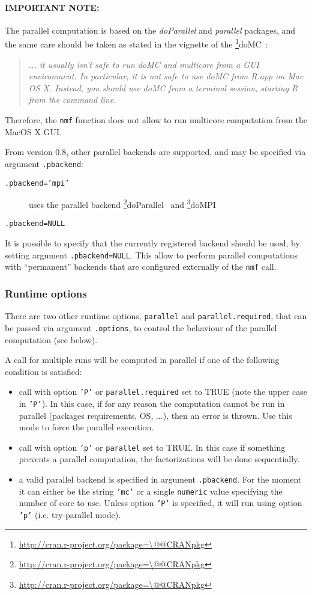 \documentclass[a4paper]{article}\usepackage{graphicx, color}
\makeatletter
\let\code=\texttt
\newcommand{\pkgname}[1]{\textit{#1}\xspace}
\newcommand{\CRANurl}[1]{\url{http://cran.r-project.org/package=#1}}
\def\CRANpkg{\@ifstar\@CRANpkg\@@CRANpkg}
\def\@CRANpkg#1{\href{http://cran.r-project.org/package=#1}{\pkgname{#1}}\footnote{\CRANurl{#1}}}
\def\@@CRANpkg#1{\href{http://cran.r-project.org/package=#1}{\pkgname{#1}} package\footnote{\CRANurl{#1}}}
\newcommand{\citeCRANpkg}[1]{\CRANpkg{#1}~\cite{#1}}
\renewcommand{\cite}[1]{\parencite{#1}}
\makeatother
\begin{document}
\medskip
\paragraph{IMPORTANT NOTE:} 
The parallel computation is based on the \pkgname{doParallel} and
\pkgname{parallel} packages, and the same care should be taken as stated in the
vignette of the \citeCRANpkg{doMC}:
\begin{quote}
\emph{... it usually isn't safe to run doMC and multicore from a GUI environment. 
In particular, it is not safe to use doMC from R.app on Mac OS X. 
Instead, you should use doMC from a terminal session, starting R from the command line.}
\end{quote}
Therefore, the \code{nmf} function does not allow to run multicore computation from the 
MacOS X GUI.

From version 0.8, other parallel backends are supported, and may be specified
via argument \code{.pbackend}:

\begin{description}
  \item[\code{.pbackend='mpi'}] uses the parallel backend \citeCRANpkg{doParallel} and \citeCRANpkg{doMPI} 
  \item[\code{.pbackend=NULL}]{}
\end{description}

It is possible to specify that the currently registered backend should be
used, by setting argument \code{.pbackend=NULL}.
This allow to perform parallel computations with ``permanent'' backends that are
configured externally of the \code{nmf} call.

\subsubsection{Runtime options}
There are two other runtime options, \code{parallel} and
\code{parallel.required}, that can be passed via argument \code{.options}, to
control the behaviour of the parallel computation (see below).

\medskip
A call for multiple runs will be computed in parallel if one of the following condition is satisfied:

\begin{itemize}
\item call with option \code{'P'} or \code{parallel.required} set to TRUE (note the upper case in \code{'P'}). 
In this case, if for any reason the computation cannot be run in parallel (packages requirements, OS, ...), then an error is thrown. Use this mode to force the parallel execution.
\item call with option \code{'p'} or \code{parallel} set to TRUE. In this case if something prevents a parallel computation, the factorizations will be done 
sequentially.
\item a valid parallel backend is specified in argument \code{.pbackend}. 
For the moment it can either be the string \code{'mc'} or a single \code{numeric} value specifying the number of core to use. Unless option \code{'P'} is specified, it will run using option \code{'p'} (i.e. try-parallel mode).
\end{itemize}
\end{document}
